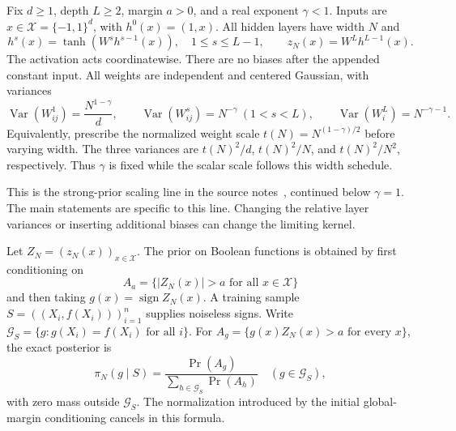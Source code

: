 \documentclass[11pt]{article}
\theoremstyle{remark}
\begin{document}
Fix $d\ge1$, depth $L\ge2$, margin $a>0$, and a real exponent
$\gamma<1$. Inputs are $x\in\mathcal X=\{-1,1\}^d$, with
$h^0(x)=(1,x)$. All hidden layers have width $N$ and
\[
 h^s(x)=\tanh(W^s h^{s-1}(x)),\quad 1\le s\le L-1,
 \qquad z_N(x)=W^Lh^{L-1}(x).
\]
The activation acts coordinatewise. There are no biases after the
appended constant input. All weights are independent and centered
Gaussian, with variances
\begin{equation}\label{eq:model-variances}
 \operatorname{Var}(W^1_{ij})=\frac{N^{1-\gamma}}d,
 \qquad \operatorname{Var}(W^s_{ij})=N^{-\gamma}\ (1<s<L),
 \qquad \operatorname{Var}(W^L_i)=N^{-\gamma-1}.
\end{equation}
Equivalently, prescribe the normalized weight scale
$t(N)=N^{(1-\gamma)/2}$ before varying width. The three variances are
$t(N)^2/d$, $t(N)^2/N$, and $t(N)^2/N^2$, respectively.
Thus $\gamma$ is fixed while the scalar scale follows this width schedule.

This is the strong-prior scaling line in the source notes~\cite{notes},
continued below $\gamma=1$. The main statements are specific to this
line. Changing the relative layer variances or inserting additional
biases can change the limiting kernel.

Let $Z_N=(z_N(x))_{x\in\mathcal X}$. The prior on Boolean functions is
obtained by first conditioning on
\[
 A_a=\{|Z_N(x)|>a\text{ for all }x\in\mathcal X\}
\]
and then taking $g(x)=\operatorname{sign}Z_N(x)$. A training sample
$S=((X_i,f(X_i)))_{i=1}^n$ supplies noiseless signs. Write
$\mathcal G_S=\{g:g(X_i)=f(X_i)\text{ for all }i\}$. For
$A_g=\{g(x)Z_N(x)>a\text{ for every }x\}$, the exact posterior is
\begin{equation}\label{eq:exact-finite-posterior}
 \pi_N(g\mid S)=
 \frac{\Pr(A_g)}{\sum_{h\in\mathcal G_S}\Pr(A_h)}
 \quad(g\in\mathcal G_S),
\end{equation}
with zero mass outside $\mathcal G_S$. The normalization introduced by
the initial global-margin conditioning cancels in this formula.
\end{document}
